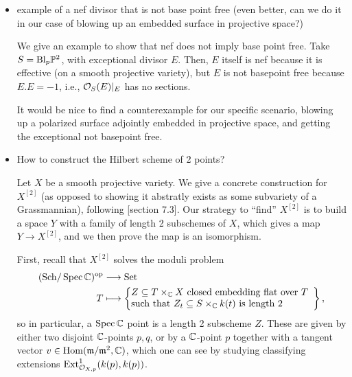 \documentclass[12pt]{article}
\newcommand{\Bl}{\mathrm{Bl}}
\begin{document}
\begin{itemize}
    \begin{proof}
        If $X \subseteq \P^n$, with blow up
        \[Y=\Bl_X \P^n,\]
        then $\cI_X(d)$ pullsback to $\cO_Y(dH-E)$, so $\cI_X(d)$ globally generated means $\cO_Y(dH-E)$ is globally generated, and in particular $dH-E$ is nef, since $dH-E$ pulled back to any curve will be globally generated, so nonnegative degree (because either 0, or nonzero with a nonzero global section).
    \end{proof}




    \item {\color{blue} example of a nef divisor that is not base point free (even better, can we do it in our case of blowing up an embedded surface in projective space?)}
    
    \begin{eg}
        We give an example to show that nef does not imply base point free. Take $S=\Bl_p \P^2$, with exceptional divisor $E$. Then, $E$ itself is nef because it is effective (on a smooth projective variety), but $E$ is not basepoint free because $E.E=-1$, i.e., $\mathcal{O}_S(E)|_E$ has no sections.
    \end{eg}

    It would be nice to find a counterexample for our specific scenario, blowing up a polarized surface adjointly embedded in projective space, and getting the exceptional not basepoint free.

    \item {\color{blue} How to construct the Hilbert scheme of 2 points?}
    
    Let $X$ be a smooth projective variety. We give a concrete construction for $X^{[2]}$ (as opposed to showing it abstratly exists as some subvariety of a Grassmannian), following \cite{fantechi_fundamental_2005}[section 7.3]. Our strategy to ``find'' $X^{[2]}$ is to build a space $Y$ with a family of length 2 subschemes of $X$, which gives a map $Y\to X^{[2]}$, and we then prove the map is an isomorphism.

    First, recall that $X^{[2]}$ solves the moduli problem
    \begin{align*}
        (\Sch/\Spec \C)^\op &\longrightarrow \Set\\
        T &\longmapsto \left\{\parbox{19em}{$Z \subseteq T\times_{\C} X$ closed embedding flat over $T$\\ such that $Z_t\subseteq S\times_\C k(t)$ is length 2}\right\},
    \end{align*}
    so in particular, a $\operatorname{Spec} \mathbb{C}$ point is a length 2 subscheme $Z$. These are given by either two disjoint $\mathbb{C}$-points $p,q$, or by a $\mathbb{C}$-point $p$ together with a tangent vector $v\in \mathrm{Hom}(\mathfrak{m}/\mathfrak{m}^2, \mathbb{C})$, which one can see by studying classifying extensions $\mathrm{Ext}_{\mathcal{O}_{X,p}}^1(k(p),k(p))$.


\end{itemize}
\end{document}
